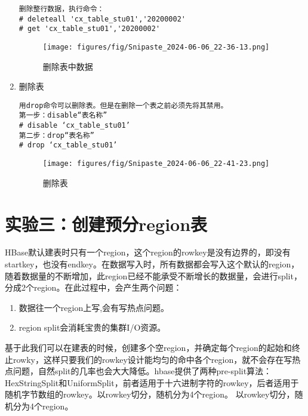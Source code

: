 \documentclass[12pt,hyperref,a4paper,UTF8]{ctexart}
\begin{document}
\begin{enumerate}
\begin{verbatim}
删除整行数据，执行命令：
# deleteall 'cx_table_stu01','20200002'
# get 'cx_table_stu01','20200002'
    \end{verbatim} 
    \begin{figure}[H]
        \centering
        \texttt{[image: figures/fig/Snipaste\_2024-06-06\_22-36-13.png]}
        \caption{删除表中数据}
        \label{fig:8}
    \end{figure} 


    \item 删除表
    \begin{verbatim}
用drop命令可以删除表。但是在删除一个表之前必须先将其禁用。
第一步：disable“表名称”
# disable ‘cx_table_stu01’
第二步：drop“表名称”
# drop ‘cx_table_stu01’
    \end{verbatim} 
    \begin{figure}[H]
        \centering
        \texttt{[image: figures/fig/Snipaste\_2024-06-06\_22-41-23.png]}
        \caption{删除表}
        \label{fig:8}
    \end{figure} 

\end{enumerate}





\section{实验三：创建预分region表}
HBase默认建表时只有一个region，这个region的rowkey是没有边界的，即没有startkey，也没有endkey。在数据写入时，所有数据都会写入这个默认的region，随着数据量的不断增加，此region已经不能承受不断增长的数据量，会进行split，分成2个region。在此过程中，会产生两个问题：
\begin{enumerate}
    \item 数据往一个region上写,会有写热点问题。
    \item region split会消耗宝贵的集群I/O资源。
\end{enumerate}


基于此我们可以在建表的时候，创建多个空region，并确定每个region的起始和终止rowky，这样只要我们的rowkey设计能均匀的命中各个region，就不会存在写热点问题，自然split的几率也会大大降低。hbase提供了两种pre-split算法：HexStringSplit和UniformSplit，前者适用于十六进制字符的rowkey，后者适用于随机字节数组的rowkey。以rowkey切分，随机分为4个region。
以rowkey切分，随机分为4个region。
\end{document}
